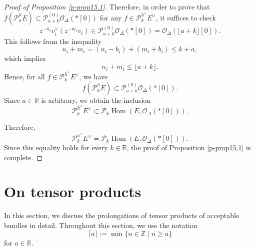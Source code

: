 \documentclass[12pt,twoside]{amsart}
\DeclareMathOperator{\Hom}{Hom}
\theoremstyle{definition}
\begin{document}
\begin{proof}[Proof of Proposition \ref{p-prop15.1}]
Therefore, in order to prove 
that \( f(\mathcal{P}^h_a E) \subset \mathcal{P}^{(0)}_{a+k} 
\mathcal{O}_\Delta(*[0]) \) for 
any \( f \in \mathcal{P}^{h^\vee}_k E^\vee \), it suffices to check
\[
z^{-n_i} v_i^\vee (z^{-m_i} v_i) 
\in \mathcal{P}^{(0)}_{a + k} 
\mathcal{O}_\Delta(*[0]) = \mathcal{O}_\Delta(\lfloor a + k \rfloor [0]).
\]
This follows from the inequality
\[
n_i + m_i = (n_i - b_i) + (m_i + b_i) \leq k + a,
\]
which implies
\[
n_i + m_i \leq \lfloor a + k \rfloor.
\]
Hence, for all \( f \in \mathcal{P}^{h^\vee}_k E^\vee \), we have
\[
f(\mathcal{P}^h_a E) \subset \mathcal{P}^{(0)}_{a + k} \mathcal{O}_\Delta(*[0]).
\]
Since \( a \in \mathbb{R} \) is arbitrary, we obtain the inclusion
\[
\mathcal{P}^{h^\vee}_k E^\vee \subset \mathcal{P}_k 
\Hom(E, \mathcal{O}_\Delta(*[0])).
\]

Therefore,
\[
\mathcal{P}^{h^\vee}_k E^\vee = \mathcal{P}_k 
\Hom(E, \mathcal{O}_\Delta(*[0])).
\]
Since this equality holds 
for every \( k \in \mathbb{R} \), the proof of Proposition \ref{p-prop15.1} is complete.
\end{proof}

\section{On tensor products}\label{p-sec16}

In this section, we discuss the prolongations of tensor products of acceptable bundles in detail. 
Throughout this section, we use the notation 
\[\lceil a \rceil := \min \{ n \in \mathbb{Z} \mid n \geq a \}
\] for $a \in \mathbb{R}$. 
\end{document}
